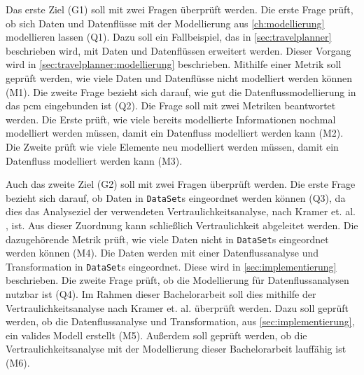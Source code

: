 Das erste Ziel (G1) soll mit zwei Fragen überprüft werden. Die erste Frage prüft, ob sich Daten und Datenflüsse mit der Modellierung aus \autoref{ch:modellierung} modellieren lassen (Q1). Dazu soll ein Fallbeispiel, das in \autoref{sec:travelplanner} beschrieben wird, mit Daten und Datenflüssen erweitert werden. Dieser Vorgang wird in \autoref{sec:travelplanner:modellierung} beschrieben. Mithilfe einer Metrik soll geprüft werden, wie viele Daten und Datenflüsse nicht modelliert werden können (M1). Die zweite Frage bezieht sich darauf, wie gut die Datenflussmodellierung in das \gls{pcm} eingebunden ist (Q2). Die Frage soll mit zwei Metriken beantwortet werden. Die Erste prüft, wie viele bereits modellierte Informationen nochmal modelliert werden müssen, damit ein Datenfluss modelliert werden kann (M2). Die Zweite prüft wie viele Elemente neu modelliert werden müssen, damit ein Datenfluss modelliert werden kann (M3). \par 
Auch das zweite Ziel (G2) soll mit zwei Fragen überprüft werden. Die erste Frage bezieht sich darauf, ob Daten in \texttt{DataSet}s eingeordnet werden können (Q3), da dies das Analyseziel der verwendeten Vertraulichkeitsanalyse, nach Kramer et. al. \cite{Kramera}, ist. Aus dieser Zuordnung kann schließlich Vertraulichkeit abgeleitet werden. Die dazugehörende Metrik prüft, wie viele Daten nicht in \texttt{DataSet}s eingeordnet werden können (M4). Die Daten werden mit einer Datenflussanalyse und Transformation in \texttt{DataSet}s eingeordnet. Diese wird in \autoref{sec:implementierung} beschrieben. Die zweite Frage prüft, ob die Modellierung für Datenflussanalysen nutzbar ist (Q4). Im Rahmen dieser Bachelorarbeit soll dies mithilfe der Vertraulichkeitsanalyse nach Kramer et. al. \cite{Kramera} überprüft werden. Dazu soll geprüft werden, ob die Datenflussanalyse und Transformation, aus \autoref{sec:implementierung}, ein valides Modell erstellt (M5). Außerdem soll geprüft werden, ob die Vertraulichkeitsanalyse mit der Modellierung dieser Bachelorarbeit lauffähig ist (M6). 

